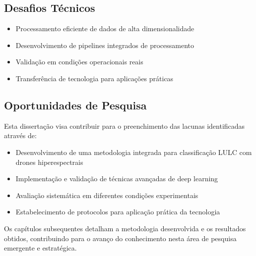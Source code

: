 \subsection{Desafios Técnicos}
\begin{itemize}
    \item Processamento eficiente de dados de alta dimensionalidade
    \item Desenvolvimento de pipelines integrados de processamento
    \item Validação em condições operacionais reais
    \item Transferência de tecnologia para aplicações práticas
\end{itemize}

\subsection{Oportunidades de Pesquisa}
Esta dissertação visa contribuir para o preenchimento das lacunas identificadas através de:
\begin{itemize}
    \item Desenvolvimento de uma metodologia integrada para classificação LULC com drones hiperespectrais
    \item Implementação e validação de técnicas avançadas de deep learning
    \item Avaliação sistemática em diferentes condições experimentais
    \item Estabelecimento de protocolos para aplicação prática da tecnologia
\end{itemize}

Os capítulos subsequentes detalham a metodologia desenvolvida e os resultados obtidos, contribuindo para o avanço do conhecimento nesta área de pesquisa emergente e estratégica.
